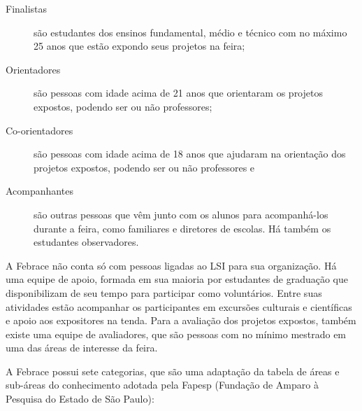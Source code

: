 \begin{description}
    \item[Finalistas] 
        são estudantes dos ensinos fundamental, médio e técnico com no máximo 25 anos que estão expondo seus projetos na feira;
    \item[Orientadores] 
        são pessoas com idade acima de 21 anos que orientaram os projetos expostos, podendo ser ou não professores;
    \item[Co-orientadores] 
        são pessoas com idade acima de 18 anos que ajudaram na orientação dos projetos expostos, podendo ser ou não professores e
    \item[Acompanhantes] 
        são outras pessoas que vêm junto com os alunos para acompanhá-los durante a feira, como familiares e diretores de escolas. Há também os estudantes observadores.
\end{description}

A Febrace não conta só com pessoas ligadas ao LSI para sua organização. Há uma equipe de apoio, formada em sua maioria por estudantes de graduação que disponibilizam de seu tempo para participar como voluntários. Entre suas atividades estão acompanhar os participantes em excursões culturais e científicas e apoio aos expositores na tenda. Para a avaliação dos projetos expostos, também existe uma equipe de avaliadores, que são pessoas com no mínimo mestrado em uma das áreas de interesse da feira.

A Febrace possui sete categorias, que são uma adaptação da tabela de áreas e sub-áreas do conhecimento adotada pela Fapesp (Fundação de Amparo à Pesquisa do Estado de São Paulo):

